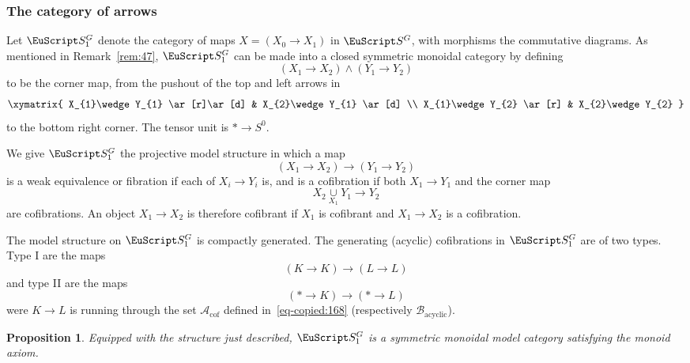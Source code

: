 \documentclass{amsart}
\newtheorem{prop}[equation]{Proposition}
\theoremstyle{definition}
\theoremstyle{remark}
\newcommand{\spectra}{\EuScript S}
\newcommand{\ugspectra}[1]{\spectra^{#1}}
\newcommand{\augspectra}[1]{\spectra_{1}^{#1}}
\newcommand{\gencof}{\mathcal A_{\text{cof}}}
\newcommand{\genacyclic}{\mathcal B_{\text{acyclic}}}
\begin{document}
\subsubsection{The category of arrows} 
\label{sec:indexed-corner-map}

Let $\augspectra{G}$ denote the category of maps $X=(X_{0}\to X_{1})$
in $\ugspectra{G}$, with morphisms the commutative diagrams.  As
mentioned in Remark~\ref{rem:47}, $\augspectra{G}$ can be made into a
closed symmetric monoidal category by defining
\[
(X_{1}\to X_{2})\wedge (Y_{1}\to Y_{2})
\]
to be the corner map, from the pushout of the top and left arrows in 
\[
\xymatrix{
X_{1}\wedge Y_{1}  \ar[r]\ar[d]  &  X_{2}\wedge Y_{1} \ar[d] \\
X_{1}\wedge Y_{2}  \ar[r]        & X_{2}\wedge Y_{2}
}
\]
to the bottom right corner.    The tensor unit is $\ast\to S^{0}$.

We give $\augspectra{G}$ the projective model structure in which a map
\begin{equation}
\label{eq:182}
(X_{1}\to X_{2}) \to (Y_{1}\to Y_{2})
\end{equation}
is a weak equivalence or fibration if each of $X_{i}\to Y_{i}$ is, and
is a cofibration if both $X_{1}\to Y_{1}$ and the corner map
\begin{equation}
\label{eq:183}
X_{2}\underset{X_{1}}{\cup} Y_{1}\to Y_{2}
\end{equation}
are cofibrations.  An object $X_{1}\to X_{2}$ is therefore cofibrant
if $X_{1}$ is cofibrant and $X_{1}\to X_{2}$ is a cofibration.  

The model structure on $\augspectra{G}$ is compactly generated.  The
generating (acyclic) cofibrations in $\augspectra{G}$ are of two
types.  Type I are the maps
\[
(K\to K) \to (L\to L)
\]
and type II are the maps 
\[
(\ast\to K) \to (\ast \to L)
\]
were $K\to L$ is running through the set $\gencof$ defined
in~\eqref{eq-copied:168} (respectively $\genacyclic$). 
\begin{prop}
\label{thm:194} 
Equipped with the structure just described,
$\augspectra{G}$ is a symmetric monoidal model category satisfying 
the monoid axiom.
\end{prop}
\end{document}
